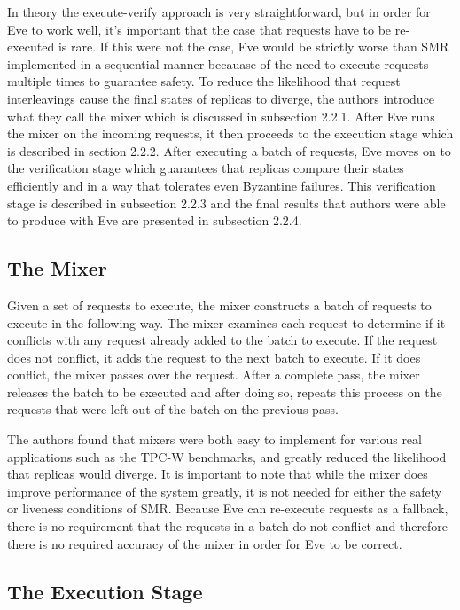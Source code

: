 \documentclass[11pt, oneside]{report}
\begin{document}
In theory the execute-verify approach is very straightforward, but in order for Eve to work well, it's important that the case that requests have to be re-executed is rare. If this were not the case, Eve would be strictly worse than SMR implemented in a sequential manner becauase of the need to execute requests multiple times to guarantee safety. To reduce the likelihood that request interleavings cause the final states of replicas to diverge, the authors introduce what they call the mixer which is discussed in subsection 2.2.1. After Eve runs the mixer on the incoming requests, it then proceeds to the execution stage which is described in section 2.2.2. After executing a batch of requests, Eve moves on to the verification stage which guarantees that replicas compare their states efficiently and in a way that tolerates even Byzantine failures. This verification stage is described in subsection 2.2.3 and the final results that authors were able to produce with Eve are presented in subsection 2.2.4.

\subsection{The Mixer}
Given a set of requests to execute, the mixer constructs a batch of requests to execute in the following way. The mixer examines each request to determine if it conflicts with any request already added to the batch to execute. If the request does not conflict, it adds the request to the next batch to execute. If it does conflict, the mixer passes over the request. After a complete pass, the mixer releases the batch to be executed and after doing so, repeats this process on the requests that were left out of the batch on the previous pass.

The authors found that mixers were both easy to implement for various real applications such as the TPC-W benchmarks, and greatly reduced the likelihood that replicas would diverge. It is important to note that while the mixer does improve performance of the system greatly, it is not needed for either the safety or liveness conditions of SMR. Because Eve can re-execute requests as a fallback, there is no requirement that the requests in a batch do not conflict and therefore there is no required accuracy of the mixer in order for Eve to be correct.

\subsection{The Execution Stage}
\end{document}
